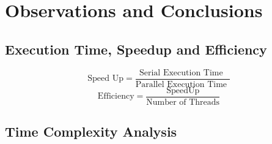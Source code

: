 \documentclass{article}
\newcommand{\cpp}{\lstinline[language=C++]}
\begin{document}
    \section{Observations and Conclusions}
    \subsection{Execution Time, Speedup and Efficiency}
    
    $$\text{Speed Up}=\frac{\text{Serial Execution Time }}{\text{Parallel Execution Time }}$$
    $$\text{Efficiency}=\frac{\text{SpeedUp}}{\text{Number of Threads}}$$
    
    
    \subsection{Time Complexity Analysis}
    
        
\end{document}
